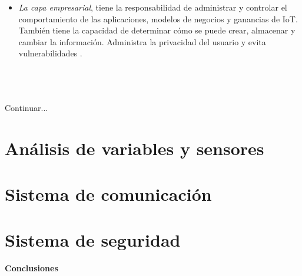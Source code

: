 \begin{itemize}
\begin{itemize}
                \item \textit{La capa empresarial}, tiene la responsabilidad de administrar y controlar el comportamiento de las aplicaciones, modelos de negocios y ganancias de IoT. También tiene la capacidad de determinar cómo se puede crear, almacenar y cambiar la información. Administra la privacidad del usuario y evita vulnerabilidades \cite{internetOfThingsStateOfTheArt}.\\\\\\\\
            \end{itemize} 
    \end{itemize}

    Continuar...


    \section{Análisis de variables y sensores}\label{sec: analisisVariables}

    \section{Sistema de comunicación}\label{sec: sistemaComunicación}

    \section{Sistema de seguridad}\label{sec: sistemaSeguridad}

    \textbf{\Large Conclusiones}\newline
